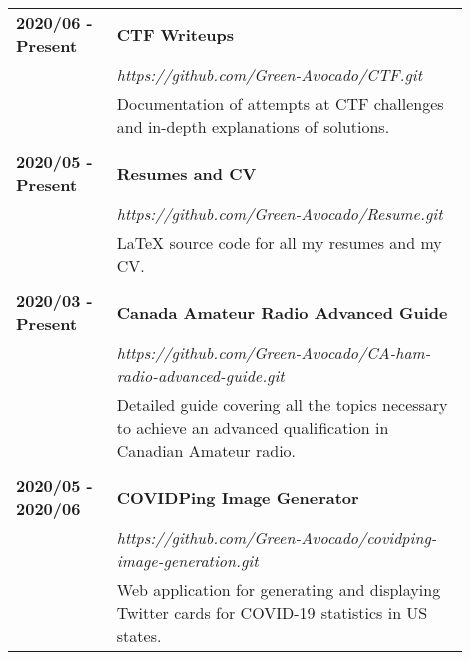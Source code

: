 \documentclass[letterpaper]{article}
\begin{document}
        \begin{tabular}{p{0.2\linewidth} p{0.7\linewidth}} 
            \textbf{2020/06 - Present} & \large\textbf{CTF Writeups} \\
            & \emph{https://github.com/Green-Avocado/CTF.git} \\
            & Documentation of attempts at CTF challenges and in-depth explanations of solutions. \\
            \\
            \textbf{2020/05 - Present} & \large\textbf{Resumes and CV} \\
            & \emph{https://github.com/Green-Avocado/Resume.git} \\
            & LaTeX source code for all my resumes and my CV. \\
            \\
            \textbf{2020/03 - Present} & \large\textbf{Canada Amateur Radio Advanced Guide} \\
            & \emph{https://github.com/Green-Avocado/CA-ham-radio-advanced-guide.git} \\
            & Detailed guide covering all the topics necessary to achieve an advanced qualification in Canadian Amateur radio. \\
            \\
            \textbf{2020/05 - 2020/06} & \large\textbf{COVIDPing Image Generator} \\
            & \emph{https://github.com/Green-Avocado/covidping-image-generation.git} \\
            & Web application for generating and displaying Twitter cards for COVID-19 statistics in US states. \\
        \end{tabular}
\end{document}
